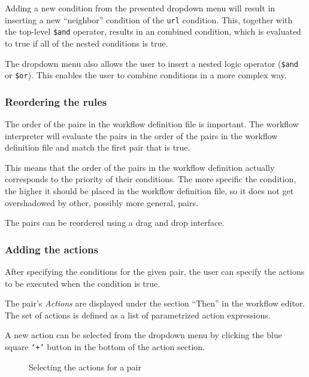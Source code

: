 Adding a new condition from the presented dropdown menu will result in inserting a new ``neighbor'' condition of the \texttt{url} condition.
This, together with the top-level \texttt{\$and} operator, results in an combined condition, which is evaluated to true if all of the nested conditions is true.

The dropdown menu also allows the user to insert a nested logic operator (\texttt{\$and} or \texttt{\$or}).
This enables the user to combine conditions in a more complex way.

\subsubsection{Reordering the rules}
    The order of the pairs in the workflow definition file is important.
    The workflow interpreter will evaluate the pairs in the order of the pairs in the workflow definition file
    and match the first pair that is true.

    This means that the order of the pairs in the workflow definition actually corresponds to the priority of their conditions.
    The more specific the condition, the higher it should be placed in the workflow definition file, so it does not get overshadowed by other, possibly more general, pairs.

    The pairs can be reordered using a drag and drop interface.

\subsubsection{Adding the actions}
After specifying the conditions for the given pair, the user can specify the actions to be executed when the condition is true.

The pair's \textit{Actions} are displayed under the section ``Then'' in the workflow editor.
The set of actions is defined as a list of parametrized action expressions.

A new action can be selected from the dropdown menu by clicking the blue square \texttt{`+'} button in the bottom of the action section.

\begin{figure}[!h]
    \begin{center}
    \end{center}
    \caption{Selecting the actions for a pair}\label{fig:tutorialActions}
\end{figure}

